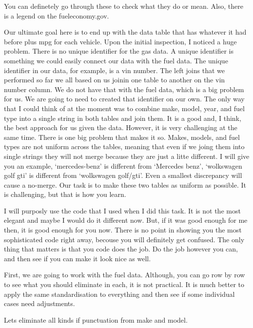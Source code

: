 \documentclass[]{book}
\newenvironment{Shaded}{\begin{snugshade}}{\end{snugshade}}
\newcommand{\CommentTok}[1]{\textcolor[rgb]{0.56,0.35,0.01}{\textit{#1}}}
\newcommand{\KeywordTok}[1]{\textcolor[rgb]{0.13,0.29,0.53}{\textbf{#1}}}
\newcommand{\NormalTok}[1]{#1}
\newcommand{\OperatorTok}[1]{\textcolor[rgb]{0.81,0.36,0.00}{\textbf{#1}}}
\newcommand{\StringTok}[1]{\textcolor[rgb]{0.31,0.60,0.02}{#1}}
\begin{document}
You can definetely go through these to check what they do or mean. Also, there is a legend on the fueleconomy.gov.

Our ultimate goal here is to end up with the data table that has whatever it had before plus mpg for each vehicle. Upon the initial inspection, I noticed a huge problem. There is no unique identifier for the gas data. A unique identifier is something we could easily connect our data with the fuel data. The unique identifier in our data, for example, is a vin number. The left joins that we performed so far we all based on us joinin one table to another on the vin number column. We do not have that with the fuel data, which is a big problem for us. We are going to need to created that identifier on our own. The only way that I could think of at the moment was to combine make, model, year, and fuel type into a single string in both tables and join them. It is a good and, I think, the best approach for us given the data. However, it is very challenging at the same time. There is one big problem that makes it so. Makes, models, and fuel types are not uniform across the tables, meaning that even if we joing them into single strings they will not merge because they are just a litte different. I will give you an example, `mercedes-benz' is different from `Mercedes benz', `wolkswagen golf gti' is different from `wolkswagen golf/gti'. Even a smallest discrepancy will cause a no-merge. Our task is to make these two tables as uniform as possible. It is challenging, but that is how you learn.

I will purposly use the code that I used when I did this task. It is not the most elegant and maybe I would do it different now. But, if it was good enough for me then, it is good enough for you now. There is no point in showing you the most sophisticated code right away, becouse you will definitely get confused. The only thing that matters is that you code does the job. Do the job however you can, and then see if you can make it look nice as well.

First, we are going to work with the fuel data. Although, you can go row by row to see what you should eliminate in each, it is not practical. It is much better to apply the same standardisation to everything and then see if some individual cases need adjustments.

Lets eliminate all kinds if punctuation from make and model.

\begin{Shaded}
\end{Shaded}
\end{document}
